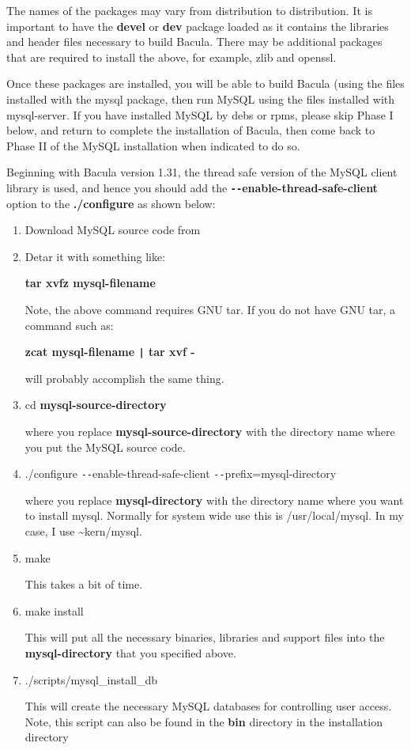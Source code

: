 The names of the packages may vary from distribution to
distribution. It is important to have the {\bf devel} or {\bf dev} package loaded as
it contains the libraries and header files necessary to build
Bacula.  There may be additional packages that are required to 
install the above, for example, zlib and openssl.   

Once these packages are installed, you will be able to build Bacula (using
the files installed with the mysql package, then run MySQL using the
files installed with mysql-server. If you have installed MySQL by debs or rpms,
please skip Phase I below, and return to complete the installation of
Bacula, then come back to Phase II of the MySQL installation when indicated
to do so.

Beginning with Bacula version 1.31, the thread safe version of the
MySQL client library is used, and hence you should add the {\bf
\verb:--:enable-thread-safe-client} option to the {\bf
./configure} as shown below:

\begin{enumerate}
\item Download MySQL source code from 

\item Detar it with something like:

   {\bf tar xvfz mysql-filename}  

Note, the above command requires GNU tar. If you do not  have GNU tar, a
command such as:

{\bf zcat mysql-filename \verb+|+ tar xvf - }  

will probably accomplish the same thing. 

\item cd {\bf mysql-source-directory}

   where you replace {\bf mysql-source-directory} with the  directory name where
   you put the MySQL source code.  

\item ./configure \verb:--:enable-thread-safe-client \verb:--:prefix=mysql-directory

   where you replace {\bf mysql-directory} with the directory  name where you
   want to install mysql. Normally for system  wide use this is /usr/local/mysql.
   In my case, I use  \~{}kern/mysql.  

\item make

   This takes a bit of time.  

\item make install

   This will put all the necessary binaries, libraries and support  files into
   the {\bf mysql-directory} that you specified above.  

\item ./scripts/mysql\_install\_db

   This will create the necessary MySQL databases for controlling  user access.
Note, this script can also be found in the  {\bf bin} directory in the
installation directory 

\end{enumerate}


